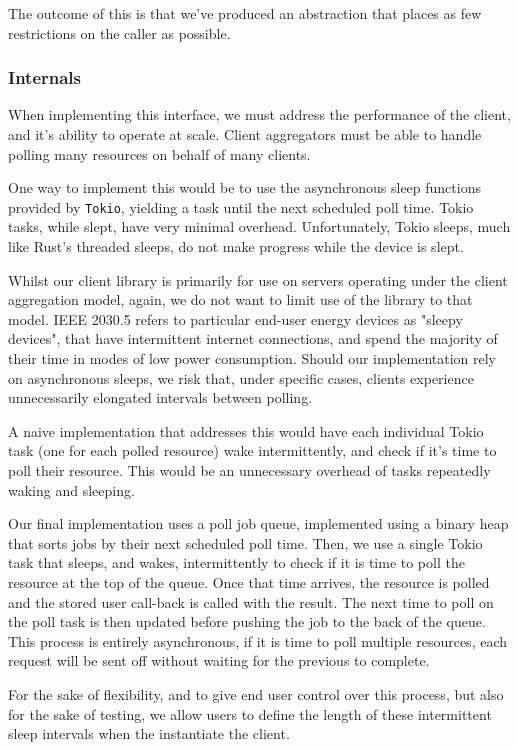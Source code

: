 The outcome of this is that we've produced an abstraction that places as few restrictions on the caller as possible.

\subsubsection{Internals}
When implementing this interface, we must address the performance of the client, and it's ability to operate at scale. Client aggregators must be able to handle polling many resources on behalf of many clients.

One way to implement this would be to use the asynchronous sleep functions provided by \texttt{Tokio}, yielding a  task until the next scheduled poll time. Tokio tasks, while slept, have very minimal overhead. Unfortunately, Tokio sleeps, much like Rust's threaded sleeps, do not make progress while the device is slept. 

Whilst our client library is primarily for use on servers operating under the client aggregation model, again, we do not want to limit use of the library to that model. IEEE 2030.5 refers to particular end-user energy devices as "sleepy devices", that have intermittent internet connections, and spend the majority of their time in modes of low power consumption. Should our implementation rely on asynchronous sleeps, we risk that, under specific cases, clients experience unnecessarily elongated intervals between polling.

A naive implementation that addresses this would have each individual Tokio task (one for each polled resource) wake intermittently, and check if it's time to poll their resource. This would be an unnecessary overhead of tasks repeatedly waking and sleeping.

Our final implementation uses a poll job queue, implemented using a binary heap that sorts jobs by their next scheduled poll time. Then, we use a single Tokio task that sleeps, and wakes, intermittently to check if it is time to poll the resource at the top of the queue. Once that time arrives, the resource is polled and the stored user call-back is called with the result. The next time to poll on the poll task is then updated before pushing the job to the back of the queue. This process is entirely asynchronous, if it is time to poll multiple resources, each request will be sent off without waiting for the previous to complete. 

For the sake of flexibility, and to give end user control over this process, but also for the sake of testing, we allow users to define the length of these intermittent sleep intervals when the instantiate the client.

